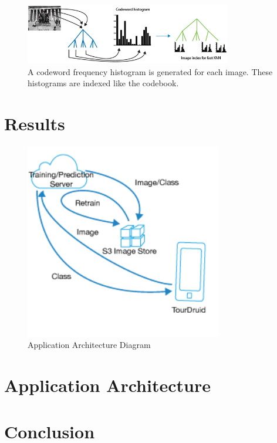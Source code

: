 \documentclass[twocolumn]{article}
\newcommand{\sectionfile}[3]{\section{#1} \label{sec:#2} }
\begin{document}
\begin{figure}
\includegraphics[width=90mm]{procedure2.png}
\caption{A codeword frequency histogram is generated for each image. These histograms are indexed like the codebook.}
\label{overflow}

\end{figure}
\sectionfile{Results}{results}{results.tex}

\begin{figure}
\includegraphics[width=86mm]{app_arch.png}

\caption{Application Architecture Diagram}
\label{overflow}

\end{figure}
\sectionfile{Application Architecture}{application_architecture}{application_architecture.tex}
\sectionfile{Conclusion}{conclusion}{conclusion.tex}

\nocite{*}
{\small


}
\end{document}
